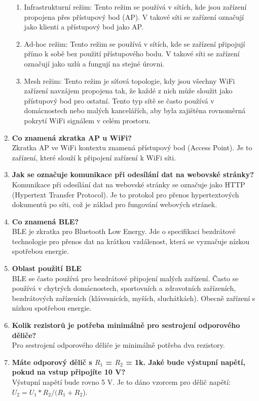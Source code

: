 \documentclass{article}
\begin{document}
\begin{enumerate}
        \begin{enumerate}
            \item {Infrastrukturní režim: Tento režim se používá v sítích, kde jsou zařízení propojena přes přístupový bod (AP). V takové síti se zařízení označují jako klienti a přístupový bod jako AP.}
            \item {Ad-hoc režim: Tento režim se používá v sítích, kde se zařízení připojují přímo k sobě bez použití přístupového bodu. V takové síti se zařízení označují jako uzlů a fungují na stejné úrovni.}
            \item {Mesh režim: Tento režim je síťová topologie, kdy jsou všechny WiFi zařízení navzájem propojena tak, že každé z nich může sloužit jako přístupový bod pro ostatní. Tento typ sítě se často používá v domácnostech nebo malých kancelářích, aby byla zajištěna rovnoměrná pokrytí WiFi signálem v celém prostoru.}
        \end{enumerate}
        \item \textbf{Co znamená zkratka AP u WiFi?} \\[0.6em] { Zkratka AP ve WiFi kontextu znamená přístupový bod (Access Point). Je to zařízení, které slouží k připojení zařízení k WiFi síti.}
        \item \textbf{Jak se označuje komunikace při odesílání dat na webovské stránky?} \\[0.6em] { Komunikace při odesílání dat na webovské stránky se označuje jako HTTP (Hypertext Transfer Protocol). Je to protokol pro přenos hypertextových dokumentů po síti, což je základ pro fungování webových stránek.}
        \item \textbf{Co znamená BLE?} \\[0.6em] { BLE je zkratka pro Bluetooth Low Energy. Jde o specifikaci bezdrátové technologie pro přenos dat na krátkou vzdálenost, která se vyznačuje nízkou spotřebou energie.}
        \item \textbf{Oblast použití BLE} \\[0.6em] { BLE se často používá pro bezdrátové připojení malých zařízení. Často se používá v chytrých domácnostech, sportovních a zdravotních zařízeních, bezdrátových zařízeních (klávesnicích, myších, sluchátkách). Obecně zařízení s nízkou spotřebou energie.}
        \item \textbf{Kolik rezistorů je potřeba minimálně pro sestrojení odporového děliče?} \\[0.6em] { Pro sestrojení odporového děliče je minimálně potřeba dva rezistory.}
        \item \textbf{Máte odporový dělič s $R_1$ = $R_2$ = 1k. Jaké bude výstupní napětí, pokud na vstup připojíte 10 V?} \\[0.6em] { Výstupní napětí bude rovno 5 V. Je to dáno vzorcem pro dělič napětí: $U_2 = U_1 * R_2 / (R_1 + R_2$).}

\end{enumerate}
\end{document}
